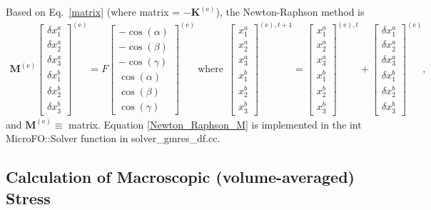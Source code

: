 \documentclass[12pt,aps,pre]{revtex4}
\begin{document}
Based on Eq.\ \eqref{matrix} (where matrix = $-\textbf{K}^{(\text{e})}$), the Newton-Raphson method is
%
\begin{eqnarray}
\textbf{M}^{(\text{e})}
%
\begin{bmatrix}
\delta x^a_1 \\ \delta x^a_2 \\ \delta x^a_3 \\ \delta x^b_1 \\ \delta x^b_2 \\ \delta x^b_3
\end{bmatrix}^{(\text{e})} =
%
F\begin{bmatrix}
-\cos(\alpha) \\ -\cos(\beta) \\ -\cos(\gamma) \\ \cos(\alpha) \\ \cos(\beta) \\ \cos(\gamma)
\end{bmatrix}^{(\text{e})}  \ \text{where} \ \
%
\begin{bmatrix}
 x^a_1 \\  x^a_2 \\  x^a_3 \\  x^b_1 \\ x^b_2 \\  x^b_3
\end{bmatrix}^{(\text{e}),t+1}  =
%
\begin{bmatrix}
 x^a_1 \\  x^a_2 \\  x^a_3 \\  x^b_1 \\ x^b_2 \\  x^b_3
\end{bmatrix}^{(\text{e}),t} +
%
\begin{bmatrix}
\delta x^a_1 \\ \delta x^a_2 \\ \delta x^a_3 \\ \delta x^b_1 \\ \delta x^b_2 \\ \delta x^b_3
\end{bmatrix}^{(\text{e})},
%
\label{Newton_Raphson_M}
\end{eqnarray}
% 
and $\textbf{M}^{(\text{e})} \equiv$ matrix. Equation \eqref{Newton_Raphson_M} is implemented in the int MicroFO::Solver function in solver\_gmres\_df.cc. 

\subsection{Calculation of Macroscopic (volume-averaged) Stress}
\end{document}
